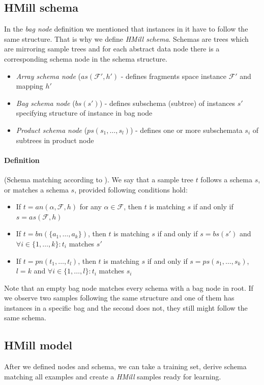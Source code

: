 \subsection{HMill schema}
In the \emph{bag node} definition we mentioned that instances in it have to follow the same structure. That is why we define \emph{HMill schema}. Schemas are trees which are mirroring sample trees and for each abstract data node there is a corresponding schema node in the schema structure. 
\begin{itemize}
    \item \emph{Array schema node} ($as(\mathcal{F'},h')$ - defines fragments space instance $\mathcal{F'}$ and mapping $h'$
    \item \emph{Bag schema node} ($bs(s')$) - defines subschema (subtree) of instances $s'$ specifying structure of instance in bag node
    \item \emph{Product schema node} ($ps(s_1,\dots,s_{l})$) - defines one or more subschemata $s_i$ of subtrees in product node
\end{itemize}

\paragraph{Definition} (Schema matching according to \cite{Mandlik2020}). We say that a sample tree $t$ follows a schema $s$, or matches a schema $s$, provided following conditions hold:
\begin{itemize}
    \item If $t=an(\alpha,\mathcal{F},h)$ for any $\alpha\in\mathcal{F}$, then $t$ is matching $s$ if and only if $s=as(\mathcal{F},h)$
    \item If $t=bn(\{a_1,\dots,a_k\})$, then $t$ is matching $s$ if and only if $s=bs(s')$ and $\forall i\in\{1,\dots,k\}:t_i$ matches $s'$
    \item If $t=pn(t_1,\dots,t_l)$, then $t$ is matching $s$ if and only if $s=ps(s_1,\dots,s_k)$,$l=k$ and $\forall i\in\{1,\dots,l\}:t_i$ matches $s_i$
\end{itemize}

Note that an empty bag node matches every schema with a bag node in root. If we observe two samples following the same structure and one of them has instances in a specific bag and the second does not, they still might follow the same schema.

\subsection{HMill model}
After we defined nodes and schema, we can take a training set, derive schema matching all examples and create a \emph{HMill} samples ready for learning. 

